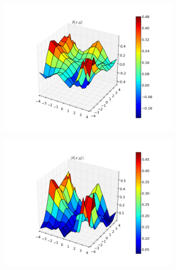 \documentclass[paper=a4, fontsize=11pt]{scrartcl} %
\numberwithin{equation}{section} %
\numberwithin{figure}{section} %
\numberwithin{table}{section} %
\begin{document}
\begin{figure}[h]
\begin{subfigure}[b]{0.5\textwidth}
\includegraphics[width=\textwidth]{img/figure_zad6.png}
\end{subfigure}
\begin{subfigure}[b]{0.5\textwidth}
\includegraphics[width=\textwidth]{img/figure_zad6_2.png}
\end{subfigure}
\begin{subfigure}[b]{0.5\textwidth}

\end{subfigure}
\end{figure}
\end{document}
